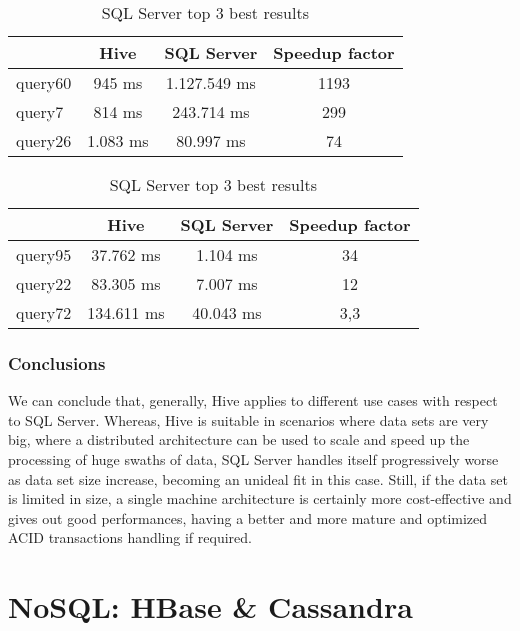 \begin{table}[!htb]
    \begin{center}
            \caption{Hive top 3 best results}
        \begin{tabular}{|l|c|c|c|} \hline
            & Hive & SQL Server & Speedup factor\\ \hline
            query60 & 945 ms & 1.127.549 ms & 1193 \\ \hline
            query7 & 814 ms & 243.714 ms & 299 \\ \hline
            query26 & 1.083 ms & 80.997 ms & 74 \\ \hline
        \end{tabular}
    \bigskip
    \caption{SQL Server top 3 best results}
        \begin{tabular}{|l|c|c|c|} \hline
        & Hive & SQL Server & Speedup factor\\ \hline
        query95 & 37.762 ms & 1.104 ms & 34 \\ \hline
        query22 & 83.305 ms & 7.007 ms & 12 \\ \hline
        query72 & 134.611 ms & 40.043 ms & 3,3 \\ \hline
    \end{tabular}
    \end{center}
\end{table}

\subsubsection{Conclusions}

We can conclude that, generally, Hive applies to different use cases with respect to SQL Server. Whereas, Hive is suitable in scenarios where data sets are very big, where a distributed architecture can be used to scale and speed up the processing of huge swaths of data, SQL Server handles itself progressively worse as data set size increase, becoming an unideal fit in this case. Still, if the data set is limited in size, a single machine architecture is certainly more cost-effective and gives out good performances, having a better and more mature and optimized ACID transactions handling if required.

\section{NoSQL: HBase \& Cassandra}

